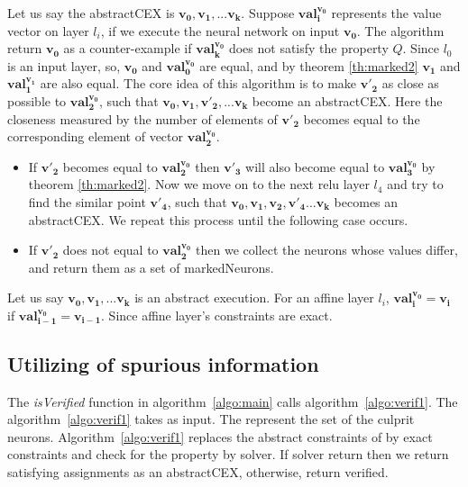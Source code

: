 Let us say the abstractCEX is $\boldsymbol{v_0}, \boldsymbol{v_1}, ... \boldsymbol{v_k}$. 
Suppose $\boldsymbol{val_i^{\boldsymbol{v_0}}}$ represents the value vector on layer $l_i$, 
if we execute the neural network on input $\boldsymbol{v_0}$. 
The algorithm return $\boldsymbol{v_0}$ as a counter-example if $\boldsymbol{val_k^{\boldsymbol{v_0}}}$ 
does not satisfy the property $Q$. 
Since $l_0$ is an input layer, so, $\boldsymbol{v_0}$ and $\boldsymbol{val_0^{v_0}}$ are equal, 
and by theorem \ref{th:marked2} $\boldsymbol{v_1}$ and $\boldsymbol{val_1^{v_1}}$ are also equal. 
The core idea of this algorithm is to make $\boldsymbol{v'_2}$ as close as possible to $\boldsymbol{val_2^{v_0}}$, 
such that $\boldsymbol{v_0}, \boldsymbol{v_1}, \boldsymbol{v'_2}, ... \boldsymbol{v_k}$ become an abstractCEX. 
Here the closeness measured by the number of elements of $\boldsymbol{v'_2}$ becomes equal to the 
corresponding element of vector $\boldsymbol{val_2^{v_0}}$.
\begin{itemize}
  \item If $\boldsymbol{v'_2}$ becomes equal to $\boldsymbol{val_2^{v_0}}$ then $\boldsymbol{v'_3}$ will also become 
    equal to $\boldsymbol{val_3^{v_0}}$ by theorem \ref{th:marked2}. 
    Now we move on to the next relu layer $l_4$ and try to find the similar point $\boldsymbol{v'_4}$, such that 
    $\boldsymbol{v_0}, \boldsymbol{v_1}, \boldsymbol{v_2}, \boldsymbol{v'_4}... \boldsymbol{v_k}$ becomes an abstractCEX. 
    We repeat this process until the following case occurs. 
  \item If $\boldsymbol{v'_2}$ does not equal to $\boldsymbol{val_2^{v_0}}$ then we collect the neurons whose values differ, 
        and return them as a set of markedNeurons. 
\end{itemize}



\begin{theorem}
  \label{th:marked2}
  Let us say $\boldsymbol{v_0}, \boldsymbol{v_1}, ... \boldsymbol{v_k}$ is an abstract execution. 
  For an affine layer $l_i$, $\boldsymbol{val_i^{\boldsymbol{v_0}}} = \boldsymbol{v_i}$ if $\boldsymbol{val_{i-1}^{\boldsymbol{v_0}}} = \boldsymbol{v_{i-1}}$.  
  Since affine layer's constraints are exact.  
\end{theorem}
 


\subsection{Utilizing of spurious information}
The \emph{isVerified} function in algorithm~\ref{algo:main} calls algorithm~\ref{algo:verif1}. 
The algorithm~\ref{algo:verif1} takes \markednewrons{} as input. 
The \markednewrons{} represent the set of the culprit neurons. 
Algorithm~\ref{algo:verif1} replaces the abstract constraints of \markednewrons{} by exact constraints and check for the 
property by \milp{} solver. If \milp{} solver return \sat{} then we return satisfying assignments as an abstractCEX, 
otherwise, return verified. 




